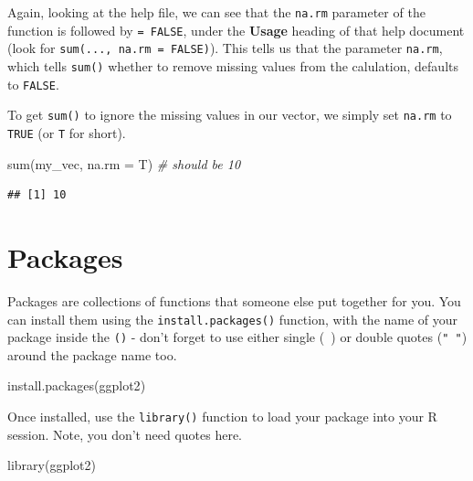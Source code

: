 \documentclass[
]{book}
\newenvironment{Shaded}{\begin{snugshade}}{\end{snugshade}}
\newcommand{\AttributeTok}[1]{\textcolor[rgb]{0.77,0.63,0.00}{#1}}
\newcommand{\CommentTok}[1]{\textcolor[rgb]{0.56,0.35,0.01}{\textit{#1}}}
\newcommand{\FunctionTok}[1]{\textcolor[rgb]{0.00,0.00,0.00}{#1}}
\newcommand{\NormalTok}[1]{#1}
\newcommand{\StringTok}[1]{\textcolor[rgb]{0.31,0.60,0.02}{#1}}
\begin{document}
Again, looking at the help file, we can see that the \texttt{na.rm} parameter of the function is followed by \texttt{=\ FALSE}, under the \textbf{Usage} heading of that help document (look for \texttt{sum(...,\ na.rm\ =\ FALSE)}). This tells us that the parameter \texttt{na.rm}, which tells \texttt{sum()} whether to remove missing values from the calulation, defaults to \texttt{FALSE}.

To get \texttt{sum()} to ignore the missing values in our vector, we simply set \texttt{na.rm} to \texttt{TRUE} (or \texttt{T} for short).

\begin{Shaded}
\begin{Highlighting}[]
\FunctionTok{sum}\NormalTok{(my\_vec, }\AttributeTok{na.rm =}\NormalTok{ T) }\CommentTok{\# should be 10}
\end{Highlighting}
\end{Shaded}

\begin{verbatim}
## [1] 10
\end{verbatim}

\hypertarget{packages}{%
\section{Packages}\label{packages}}

Packages are collections of functions that someone else put together for you. You can install them using the \texttt{install.packages()} function, with the name of your package inside the \texttt{()} - don't forget to use either single (\texttt{\textquotesingle{}\ \textquotesingle{}}) or double quotes (\texttt{"\ "}) around the package name too.

\begin{Shaded}
\begin{Highlighting}[]
\FunctionTok{install.packages}\NormalTok{(}\StringTok{\textquotesingle{}ggplot2\textquotesingle{}}\NormalTok{)}
\end{Highlighting}
\end{Shaded}

Once installed, use the \texttt{library()} function to load your package into your R session. Note, you don't need quotes here.

\begin{Shaded}
\begin{Highlighting}[]
\FunctionTok{library}\NormalTok{(ggplot2)}
\end{Highlighting}
\end{Shaded}
\end{document}
